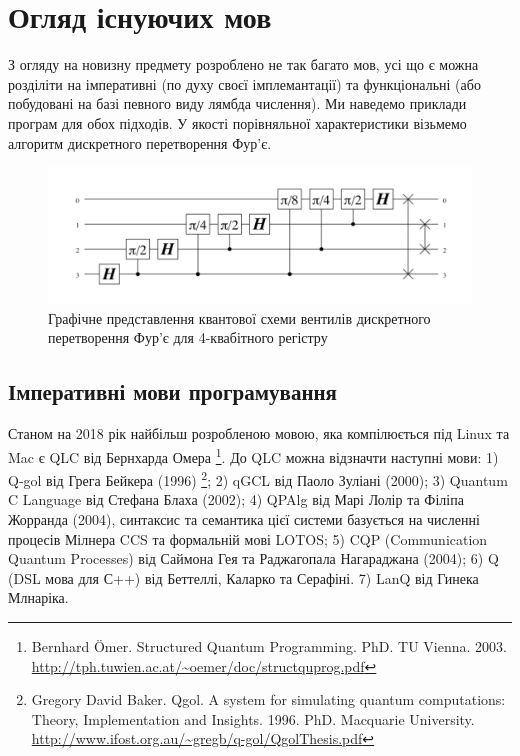\documentclass{article}
\theoremstyle{definition}
\begin{document}
\newpage
\section{Огляд існуючих мов}
З огляду на новизну предмету розроблено не так багато мов, усі що є можна розділіти
на імперативні (по духу своєї імплемантації) та функціональні (або побудовані на базі певного виду
лямбда числення). Ми наведемо приклади програм для обох підходів.
У якості порівняльної характеристики візьмемо алгоритм дискретного перетворення Фур'є.

\begin{figure}[h]
  \centerline{\includegraphics[scale=0.3]{fourier.png}}
  \caption{Графічне представлення квантової схеми вентилів дискретного перетворення Фур'є для 4-квабітного регістру}
\end{figure}

\newpage
\subsection{Імперативні мови програмування}
Станом на 2018 рік найбільш розробленою мовою, яка компілюється під Linux та Mac
є QLC від Бернхарда Омера
\footnote{Bernhard Ömer. Structured Quantum Programming. PhD. TU Vienna. 2003.
          \url{http://tph.tuwien.ac.at/~oemer/doc/structquprog.pdf}}.
До QLC можна відзначти наступні мови:
1) Q-gol від Грега Бейкера (1996)
   \footnote{Gregory David Baker.
             Qgol. A system for simulating quantum computations:
             Theory, Implementation and Insights. 1996. PhD. Macquarie University. \\
             \url{http://www.ifost.org.au/~gregb/q-gol/QgolThesis.pdf}};
2) qGCL від Паоло Зуліані (2000)\cite{Sanders2000};
3) Quantum C Language від Стефана Блаха (2002);
4) QPAlg від Марі Лолір та Філіпа Жорранда (2004)\cite{Lalire2004}, синтаксис та семантика цієї системи базується на численні процесів Мілнера CCS та формальній мові LOTOS;
5) CQP (Communication Quantum Processes) від Саймона Гея та Раджагопала Нагараджана (2004)\cite{Gay2005};
6) Q (DSL мова для С++) від Беттеллі, Каларко та Серафіні\cite{}.
7) LanQ від Гинека Млнаріка\cite{Mlnarik2007}.
\end{document}
